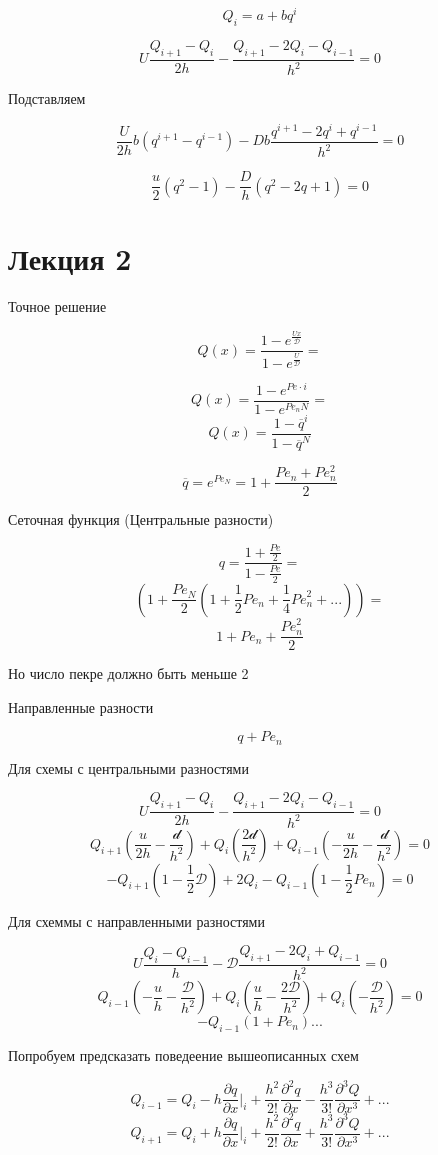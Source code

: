 \documentclass[14pt]{extarticle}
\begin{document}
\[ Q_i = a + b q^i \]

\[ U \frac{Q_{i+1} - Q_i}{2h} - \frac{Q_{i+1} - 2Q_{i} - Q_{i-1}}{h^2} = 0\]

Подставляем

\[ \frac{U}{2h} b(q^{i+1} - q^{i-1}) -  D b \frac{q^{i+1}-2q^i+q^{i-1}}{h^2} = 0 \]

\[ \frac{u}{2} (q^2-1) - \frac{D}{h}(q^2-2q+1) = 0 \]

\section{Лекция 2}

Точное решение

\[ Q(x) = \frac{1-e^{\frac{Ux}{\mathcal{D}}}}{1-e^{\frac{U}{\mathcal{D}}}} = \]

\[ Q(x) = \frac{1-e^{Pe \cdot i}}{1-e^{Pe_n N}}=  \]
\[ Q(x) = \frac{1-\overline{q}^i}{1-\overline{q}^N} \]

\[ \overline{q} = e^{Pe_N} = 1+ \frac{Pe_n + Pe_n^2}{2}\]

Сеточная функция (Центральные разности)

\[ q = \frac{1+ \frac{Pe}{2}}{1- \frac{Pe}{2}} =  \]
\[ (1+ \frac{Pe_N}{2}(1+ \frac{1}{2} {Pe}_n + \frac{1}{4}{Pe}^2_n+...)) =  \]
\[ 1+ {Pe}_n + \frac{{Pe}^2_n}{2} \]

Но число пекре должно быть меньше 2

Направленные разности

\[  q + {Pe}_n \]

Для схемы с центральными разностями

\[ U \frac{Q_{i+1} - Q_i}{2h} - \frac{Q_{i+1} - 2Q_{i} - Q_{i-1}}{h^2} = 0\]
\[ Q_{i+1} (\frac{u}{2h} - \frac{\mathcal{d}}{h^2}) + Q_{i} (\frac{2\mathcal{d}}{h^2}) + Q_{i-1} (-\frac{u}{2h} - \frac{\mathcal{d}}{h^2}) = 0 \]
\[ - Q_{i+1} (1 - \frac{1}{2} \mathcal{D}) + 2Q_{i} - Q_{i-1} (1 - \frac{1}{2} {Pe}_n) = 0 \]

Для схеммы с направленными разностями

\[ U \frac{Q_{i} - Q_{i-1}}{h} - \mathcal{D}\frac{Q_{i+1} - 2Q_{i} + Q_{i-1}}{h^2} = 0\]
\[ Q_{i-1} (-\frac{u}{h}-\frac{\mathcal{D}}{h^2}) + Q_i(\frac{u}{h}-\frac{2\mathcal{D}}{h^2}) + Q_i(-\frac{\mathcal{D}}{h^2}) = 0\]
\[ -Q_{i-1} (1+{Pe}_n) ... \]

Попробуем предсказать поведеение вышеописанных схем

\[ Q_{i-1} = Q_i - h \frac{\partial q}{\partial x}|_i + \frac{h^2}{2!} \frac{\partial^2 q }{\partial x} - \frac{h^3}{3!} \frac{\partial^3 Q }{\partial x^3}+... \]
\[ Q_{i+1} = Q_i + h \frac{\partial q}{\partial x}|_i + \frac{h^2}{2!} \frac{\partial^2 q }{\partial x} + \frac{h^3}{3!} \frac{\partial^3 Q }{\partial x^3}+... \]
\end{document}
